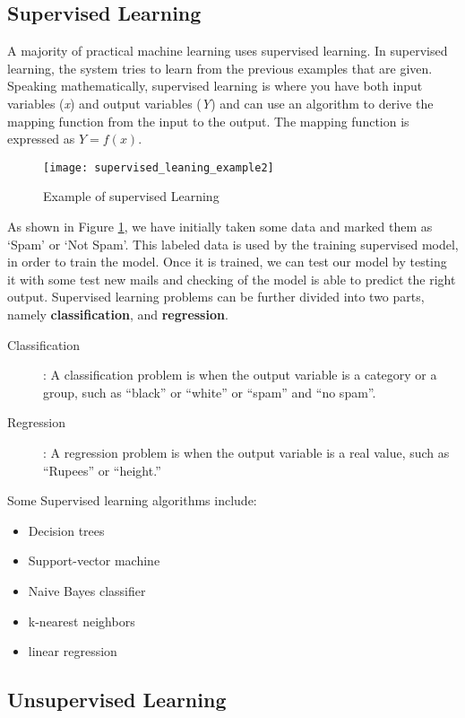 \documentclass{report}
\begin{document}
\subsection{Supervised Learning}
A majority of practical machine learning uses supervised learning. In supervised learning, the system tries to learn from the previous examples that are given. Speaking mathematically, supervised learning is where you have both input variables (\textit{x}) and output variables (\textit{Y}) and can use an algorithm to derive the mapping function from the input to the output. The mapping function is expressed as
$Y = f(x)$.
\begin{figure}[h]
  \centering
  \texttt{[image: supervised\_leaning\_example2]}
  \caption{Example of supervised Learning}
  \label{fig:supervised_learning_example}
\end{figure}
As shown in Figure \ref{fig:supervised_learning_example}, we have initially taken some data and marked them as ‘Spam’ or ‘Not Spam’. This
labeled data is used by the training supervised model, in order to train the model. Once it is trained, we can test our model by testing it with some test new mails and checking of the model is able to predict the right output. 
Supervised learning problems can be further divided into two parts, namely \textbf{classification}, and \textbf{regression}.
\begin{description}
\item[ Classification] : A classification problem is when the output variable is a category or a group, such as “black” or “white” or “spam” and “no spam”.
\item[ Regression ] :  A regression problem is when the output variable is a real value, such as “Rupees” or “height.”
\end{description}
Some Supervised learning algorithms include:
\begin{itemize}
\item Decision trees
\item Support-vector machine
\item Naive Bayes classifier
\item k-nearest neighbors
\item linear regression
\end{itemize}

\subsection{Unsupervised Learning}
\end{document}
